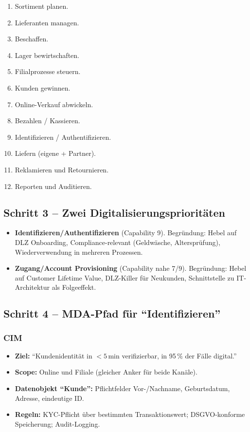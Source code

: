 \documentclass[11pt,a4paper,oneside]{article}
\begin{document}
\begin{enumerate}
  \item Sortiment planen.
  \item Lieferanten managen.
  \item Beschaffen.
  \item Lager bewirtschaften.
  \item Filialprozesse steuern.
  \item Kunden gewinnen.
  \item Online-Verkauf abwickeln.
  \item Bezahlen / Kassieren.
  \item Identifizieren / Authentifizieren.
  \item Liefern (eigene + Partner).
  \item Reklamieren und Retournieren.
  \item Reporten und Auditieren.
\end{enumerate}

\subsection{Schritt 3 -- Zwei Digitalisierungsprioritäten}

\begin{itemize}
  \item \textbf{Identifizieren/Authentifizieren} (Capability 9). Begründung: Hebel auf DLZ Onboarding, Compliance-relevant (Geldwäsche, Altersprüfung), Wiederverwendung in mehreren Prozessen.
  \item \textbf{Zugang/Account Provisioning} (Capability nahe 7/9). Begründung: Hebel auf Customer Lifetime Value, DLZ-Killer für Neukunden, Schnittstelle zu IT-Architektur als Folgeeffekt.
\end{itemize}

\subsection{Schritt 4 -- MDA-Pfad für ``Identifizieren''}

\subsubsection{CIM}

\begin{itemize}
  \item \textbf{Ziel:} ``Kundenidentität in $<5\,\text{min}$ verifizierbar, in 95\,\% der Fälle digital.''
  \item \textbf{Scope:} Online und Filiale (gleicher Anker für beide Kanäle).
  \item \textbf{Datenobjekt ``Kunde'':} Pflichtfelder Vor-/Nachname, Geburtsdatum, Adresse, eindeutige ID.
  \item \textbf{Regeln:} KYC-Pflicht über bestimmten Transaktionswert; DSGVO-konforme Speicherung; Audit-Logging.
\end{itemize}
\end{document}
